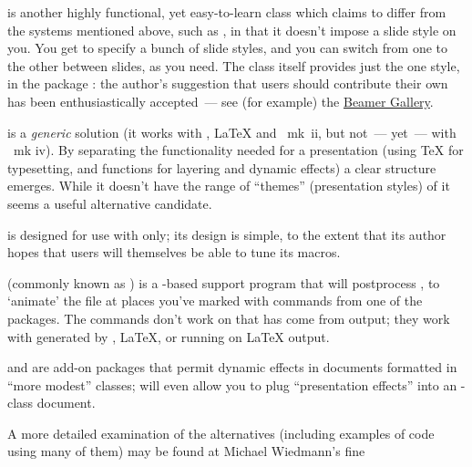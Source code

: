  is another highly functional, yet easy-to-learn class
which claims to differ from the systems mentioned above, such as
, in that it doesn't impose a slide style on you.  You
get to specify a bunch of slide styles, and you can switch from one to
the other between slides, as you need.  The class itself provides
just the one style, in the package : the author's
suggestion that users should contribute their own has been
enthusiastically accepted~--- see (for example) the %
\href{http://deic.uab.es/~iblanes/beamer_gallery/}{Beamer Gallery}.

 is a \emph{generic} solution (it works with
\plaintex{}, \LaTeX{} and \context{}~mk~ii, but not~--- yet~--- with
\context{}~mk iv).  By separating the functionality needed for a
presentation (using \TeX{} for typesetting, and  functions
for layering and dynamic effects) a clear structure emerges.  While it
doesn't have the range of ``themes'' (presentation styles) of
 it seems a useful alternative candidate.

 is designed for use with \plaintex{} only; its
design is simple, to the extent that its author hopes that users will
themselves be able to tune its macros.

 (commonly known as ) is a
-based support program that will postprocess
, to `animate' the file at places you've marked with
commands from one of the  packages.  The commands don't
work on  that has come from  output; they
work with  generated by \PDFLaTeX{}, \LaTeX{}, or
 running on \LaTeX{} output.

 and  are add-on packages that
permit dynamic effects in documents formatted in ``more modest''
classes;  will even allow you to plug
``presentation effects'' into an -class document.


A more detailed examination of the alternatives (including examples
of code using many of them) may be found at Michael Wiedmann's fine

